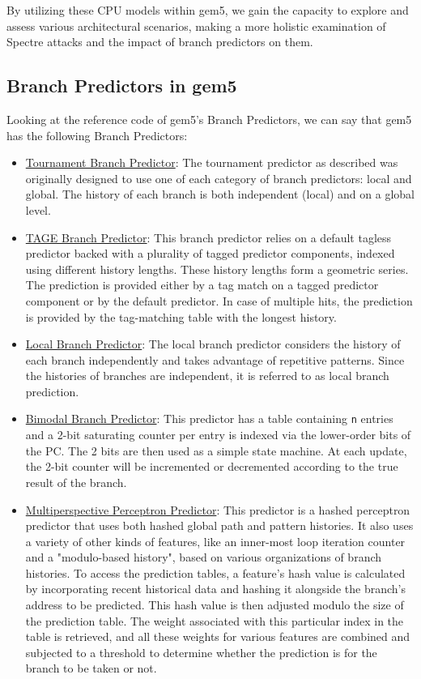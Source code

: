 \documentclass[twocolumn,showpacs,%
  nofootinbib,aps,superscriptaddress,%
  eqsecnum,prd,notitlepage,showkeys,10pt]{revtex4-1}
\begin{document}
By utilizing these CPU models within gem5, we gain the capacity to explore and assess various architectural scenarios, making a more holistic examination of Spectre attacks and the impact of branch predictors on them.

\subsection{Branch Predictors in gem5}

Looking at the reference code of gem5's Branch Predictors, we can say that gem5 has the following Branch Predictors\cite{Branch}:

\begin{itemize}
    \item \underline{Tournament Branch Predictor}: The tournament predictor as described was originally designed to use one of each category of branch predictors: local and global. The history of each branch is both independent (local) and on a global level.\cite{mcfarling1993combining}
    \item \underline{TAGE Branch Predictor}: This branch predictor relies on a default tagless predictor backed with a plurality of tagged predictor components, indexed using different history lengths. These history lengths form a geometric series. The prediction is provided either by a tag match on a tagged predictor component or by the default predictor. In case of multiple hits, the prediction is provided by the tag-matching table with the longest history.\cite{seznec2006case}
    \item \underline{Local Branch Predictor}: The local branch predictor considers the history of each branch independently and takes advantage of repetitive patterns. Since the histories of branches are independent, it is referred to as local branch prediction.\cite{mcfarling1993combining}
    \item \underline{Bimodal Branch Predictor}: This predictor has a table containing \texttt{n} entries and a 2-bit saturating counter per entry is indexed via the lower-order bits of the PC. The 2 bits are then used as a simple state machine. At each update, the 2-bit counter will be incremented or decremented according to the true result of the branch.\cite{peress2008historical}
    \item \underline{Multiperspective Perceptron Predictor}: This predictor is a hashed perceptron predictor that uses both hashed global path and pattern histories. It also uses a variety of other kinds of features, like an inner-most loop iteration counter and a "modulo-based history",  based on various organizations of branch histories. To access the prediction tables, a feature's hash value is calculated by incorporating recent historical data and hashing it alongside the branch's address to be predicted. This hash value is then adjusted modulo the size of the prediction table. The weight associated with this particular index in the table is retrieved, and all these weights for various features are combined and subjected to a threshold to determine whether the prediction is for the branch to be taken or not.\cite{jimenez2016multiperspective}
\end{itemize}
\end{document}
